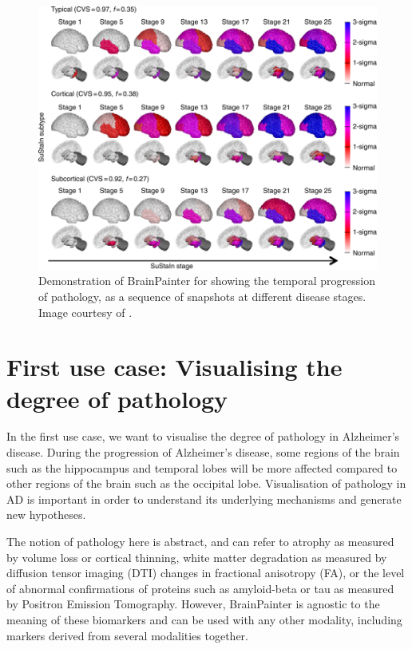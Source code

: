 \documentclass{llncs}
\begin{document}
\begin{figure}[htp]
\centering
 \includegraphics[width=1\textwidth, trim=20 0 0 220, clip]{images/young_progression.png}
 \caption{Demonstration of BrainPainter for showing the temporal progression of pathology, as a sequence of snapshots at different disease stages. Image courtesy of \cite{young2018uncovering}.}
  \label{fig:youngProg}
\end{figure}

\section{First use case: Visualising the degree of pathology}
\label{degree}

In the first use case, we want to visualise the degree of pathology in Alzheimer's disease. During the progression of Alzheimer's disease, some regions of the brain such as the hippocampus and temporal lobes will be more affected compared to other regions of the brain such as the occipital lobe. Visualisation of pathology in AD is important in order to understand its underlying mechanisms and generate new hypotheses. 

The notion of pathology here is abstract, and can refer to atrophy as measured by volume loss or cortical thinning, white matter degradation as measured by diffusion tensor imaging (DTI) changes in fractional anisotropy (FA), or the level of abnormal confirmations of proteins such as amyloid-beta or tau as measured by Positron Emission Tomography. However, BrainPainter is agnostic to the meaning of these biomarkers and can be used with any other modality, including markers derived from several modalities together. 
\end{document}
